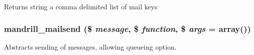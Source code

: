 \begin{DoxyReturn}{Returns}
string a comma delimited list of mail keys 
\end{DoxyReturn}
\hypertarget{mandrill_8module_a3491d792be9e5ad28ca92986f432f23e}{
\subsubsection[{mandrill\_\-mailsend}]{\setlength{\rightskip}{0pt plus 5cm}mandrill\_\-mailsend (\$ {\em message}, \/  \$ {\em function}, \/  \$ {\em args} = {\ttfamily array()})}}
\label{mandrill_8module_a3491d792be9e5ad28ca92986f432f23e}
Abstracts sending of messages, allowing queueing option.


